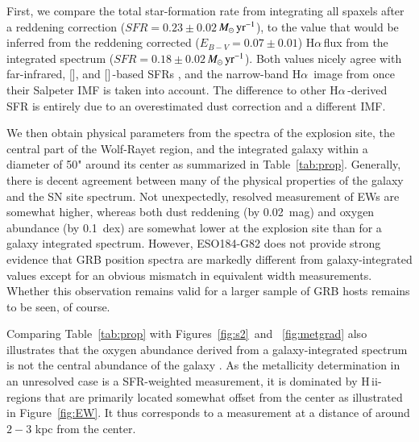 \documentclass[traditabstract]{aa}
\newcommand{\ha}{H$\alpha$}
\newcommand{\hii}{\mbox{H\,{\sc ii}}}
\newcommand{\oi}{[\ion{O}{i}]}
\newcommand{\cii}{[\ion{C}{ii}]}
\newcommand{\Msunyr}{$M_\odot\,\rm{yr}^{-1}$}
\begin{document}
First, we compare the total star-formation rate from integrating all spaxels after a reddening correction ($SFR=0.23\pm0.02$\,\Msunyr), to the value that would be inferred from the reddening corrected ($E_{B-V}=0.07\pm0.01$) \ha\,flux from the integrated spectrum ($SFR=0.18\pm0.02$\,\Msunyr). Both values nicely agree with far-infrared, \oi, and \cii\,-based SFRs \citep{2014A&A...562A..70M, 2016arXiv160901742M}, and the narrow-band \ha\, image from \citet{2005NewA...11..103S} once their Salpeter IMF is taken into account. The difference to other \ha\,-derived SFR \citep{2006A&A...454..103H, 2008A&A...490...45C} is entirely due to an overestimated dust correction and a different IMF.

We then obtain physical parameters from the spectra of the explosion site, the central part of the Wolf-Rayet region, and the integrated galaxy within a diameter of 50" around its center as summarized in Table~\ref{tab:prop}. Generally, there is decent agreement between many of the physical properties of the galaxy and the SN site spectrum. Not unexpectedly, resolved measurement of EWs are somewhat higher, whereas both dust reddening (by 0.02~mag) and oxygen abundance (by 0.1~dex) are somewhat lower at the explosion site than for a galaxy integrated spectrum. However, ESO184-G82 does not provide strong evidence that GRB position spectra are markedly different from galaxy-integrated values except for an obvious mismatch in equivalent width measurements. Whether this observation remains valid for a larger sample of GRB hosts remains to be seen, of course.

Comparing Table~\ref{tab:prop} with Figures~\ref{fig:s2}~and ~\ref{fig:metgrad} also illustrates that the oxygen abundance derived from a galaxy-integrated spectrum is not the central abundance of the galaxy \citep[see also e.g.,][]{2016A&A...591A..48G}. As the metallicity determination in an unresolved case is a SFR-weighted measurement, it is dominated by \hii-regions that are primarily located somewhat offset from the center as illustrated in Figure~\ref{fig:EW}. It thus corresponds to a measurement at a distance of around $2-3$ kpc from the center. 
\end{document}
